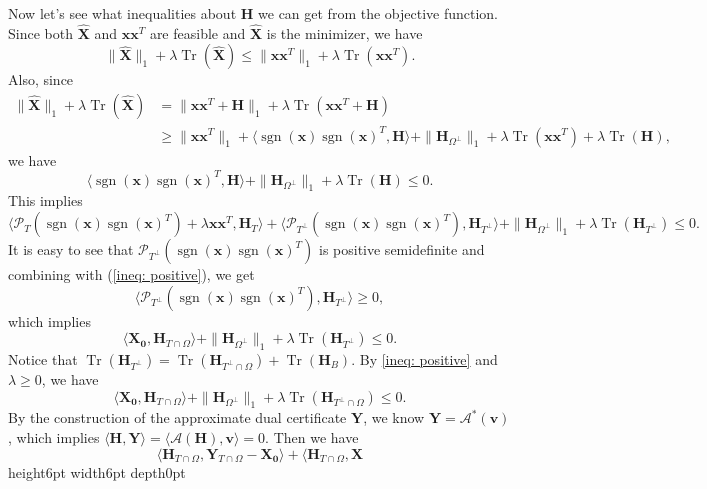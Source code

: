 \documentclass[11pt]{article}
\newcommand{\<}{\langle}
\renewcommand{\>}{\rangle}
\newcommand{\vct}[1]{\bm{#1}}
\newcommand{\mtx}[1]{\bm{#1}}
\newcommand{\sgn}{\operatorname{sgn}}
\newcommand{\tr}{\operatorname{Tr}}
\numberwithin{equation}{section}
\def \endprf{\hfill {\vrule height6pt width6pt depth0pt}\medskip}
\newenvironment{proof}{\noindent {\bf Proof} }{\endprf\par}
\newcommand{\PT}{\mathcal{P}_T}
\newcommand{\PTp}{\mathcal{P}_{T^\perp}}
\newcommand{\cA}{\mathcal{A}}
\begin{document}
\begin{proof}
Now let's see what inequalities about $\mtx{H}$ we can get from the objective function. Since both $\mtx{\hat{X}}$ and $\vct
{x}\vct{x}^T$ are feasible and $\mtx{\hat{X}}$ is the minimizer, we have
\[
\|\mtx{\hat{X}}\|_1+\lambda \tr(\mtx{\hat{X}})\leq\|\vct{x}\vct{x}^T\|_1+\lambda \tr(\vct{x}\vct{x}^T).
\]
Also, since
\begin{align*}
\|\mtx{\hat{X}}\|_1+\lambda \tr(\mtx{\hat{X}})     & =      \|\vct{x}\vct{x}^T+\mtx{H}\|_1+\lambda \tr(\vct{x}\vct{x}^T+
\mtx{H})\\
                                                                                                  &\geq \|\vct{x}\vct{x}^T\|_1+\langle \sgn(\vct{x})\sgn(\vct{x})^T, \mtx
{H}\rangle+\|\mtx{H}_{\Omega^\perp}\|_1+\lambda\tr(\vct{x}\vct{x}^T)+\lambda\tr(\mtx{H}),
\end{align*}
we have
\begin{equation*}
\langle \sgn(\vct{x})\sgn(\vct{x})^T, \mtx{H}\rangle+\|\mtx{H}_{\Omega^\perp}\|_1+\lambda\tr(\mtx{H})\leq 0.
\end{equation*}
This implies
\begin{equation*}
\langle \PT(\sgn(\vct{x})\sgn(\vct{x})^T)+\lambda\vct{x}\vct{x}^T, \mtx{H}_T\rangle+\langle \PTp(\sgn(\vct{x})\sgn(\vct
{x})^T), \mtx{H}_{T^\perp}\rangle+\|\mtx{H}_{\Omega^\perp}\|_1+\lambda\tr(\mtx{H}_{T^\perp})\leq 0.
\end{equation*}
It is easy to see that $\PTp(\sgn(\vct{x})\sgn(\vct{x})^T)$ is positive semidefinite and combining with (\ref{ineq: positive}), we 
get 
\[
\langle \PTp(\sgn(\vct{x})\sgn(\vct{x})^T), \mtx{H}_{T^\perp}\rangle\geq 0,
\]
which implies
\begin{equation*}
\langle \mtx{X_0}, \mtx{H}_{T\cap \Omega}\rangle+\|\mtx{H}_{\Omega^\perp}\|_1+\lambda\tr(\mtx{H}_{T^\perp})\leq 
0.
\end{equation*}
Notice that $\tr(\mtx{H}_{T^\perp})=\tr(\mtx{H}_{T^\perp\cap \Omega})+\tr(\mtx{H}_B)$. By \eqref{ineq: positive} and $
\lambda\geq 0$, we have
\begin{equation}
\label{ineq: optimality}
\langle \mtx{X_0}, \mtx{H}_{T\cap \Omega}\rangle+\|\mtx{H}_{\Omega^\perp}\|_1+\lambda\tr(\mtx{H}_{T^\perp\cap 
\Omega})\leq 0.
\end{equation}
By the construction of the approximate dual certificate $\mtx{Y}$, we know $\mtx{Y}=\cA^*(\vct{v})$, which implies $\langle 
\mtx{H}, \mtx{Y}\rangle=\langle \cA(\mtx{H}), \vct{v}\rangle=0$. Then we have
\[
\langle \mtx{H}_{T\cap \Omega}, \mtx{Y}_{T\cap \Omega}-\mtx{X_0} \rangle+\langle \mtx{H}_{T\cap \Omega}, \mtx{X}
\]
\end{proof}
\end{document}
